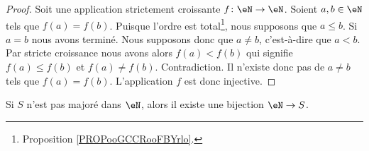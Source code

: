 \begin{proof}
	Soit une application strictement croissante \( f\colon \eN\to \eN\). Soient \( a,b\in \eN\) tels que \( f(a)=f(b)\). Puisque l'ordre est total\footnote{Proposition \ref{PROPooGCCRooFBYrlo}.}, nous supposons que \( a\leq b\). Si \( a=b\) nous avons terminé. Nous supposons donc que \( a\neq b\), c'est-à-dire que \( a<b\). Par stricte croissance nous avons alors \( f(a)<f(b)\) qui signifie \( f(a)\leq f(b)\) et \( f(a)\neq f(b)\). Contradiction. Il n'existe donc pas de \( a\neq b\) tels que \( f(a)=f(b)\). L'application \( f\) est donc injective.
\end{proof}

\begin{lemma}        \label{LEMooFKLPooPrmeUU}
	Si \( S\) n'est pas majoré dans \( \eN\), alors il existe une bijection \( \eN\to S\).
\end{lemma}

